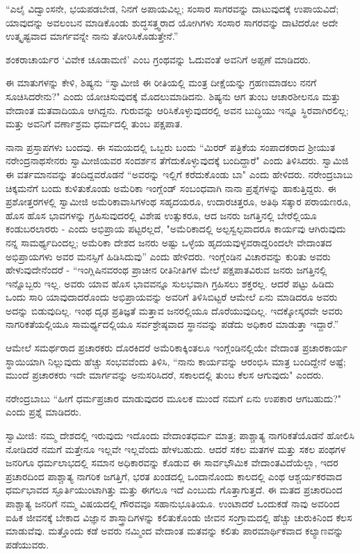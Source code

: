 “ಎಲೈ ವಿದ್ವಾಂಸನೇ, ಭಯಪಡಬೇಡ, ನಿನಗೆ ಅಪಾಯವಿಲ್ಲ; ಸಂಸಾರ ಸಾಗರವನ್ನು ದಾಟುವುದಕ್ಕೆ ಉಪಾಯವಿದೆ; ಯಾವುದನ್ನು ಅವಲಂಬನ ಮಾಡಿಕೊಂಡು ಶುದ್ಧಸತ್ತ್ವರಾದ ಯೋಗಿಗಳು ಸಂಸಾರ ಸಾಗರವನ್ನು ದಾಟಿದರೋ ಅದೇ ಉತ್ಕೃಷ್ಟವಾದ ಮಾರ್ಗವನ್ನೇ ನಾನು ತೋರಿಸಿಕೊಡುತ್ತೇನೆ.”

ಶಂಕರಾಚಾರ್ಯರ ‘ವಿವೇಕ ಚೂಡಾಮಣಿ’ ಎಂಬ ಗ್ರಂಥವನ್ನು ಓದುವಂತೆ ಅವನಿಗೆ ಅಪ್ಪಣೆ ಮಾಡಿದರು.

ಈ ಮಾತುಗಳನ್ನು ಕೇಳಿ, ಶಿಷ್ಯನು “ಸ್ವಾಮೀಜಿ ಈ ರೀತಿಯಲ್ಲಿ ಮಂತ್ರ ದೀಕ್ಷೆಯನ್ನು ಗ್ರಹಣಮಾಡಲು ನನಗೆ ಸೂಚಿಸಿದರೇನು?" ಎಂದು ಯೋಚಿಸುವುದಕ್ಕೆ ಮೊದಲುಮಾಡಿದನು. ಶಿಷ್ಯನು ಆಗ ತುಂಬ ಆಚಾರಶೀಲನೂ ಮತ್ತು ವೇದಾಂತ ಮತವಾದಿಯೂ ಆಗಿದ್ದನು. ಗುರುವನ್ನು ಆರಿಸಿಕೊಳ್ಳುವುದರಲ್ಲಿ ಅವನ ಬುದ್ಧಿಯು ಇನ್ನೂ ಸ್ಥಿರವಾಗಿರಲಿಲ್ಲ; ಮತ್ತು ಅವನಿಗೆ ವರ್ಣಾಶ್ರಮ ಧರ್ಮದಲ್ಲಿ ತುಂಬ ಪಕ್ಷಪಾತ.

ನಾನಾ ಪ್ರಸ್ತಾಪಗಳು ಬಂದವು. ಈ ಸಮಯದಲ್ಲಿ ಒಬ್ಬರು ಬಂದು “ಮಿರರ್ ಪತ್ರಿಕೆಯ ಸಂಪಾದಕರಾದ ಶ‍್ರೀಯುತ ನರೇಂದ್ರನಾಥಸೇನರು ಸ್ವಾಮೀಜಿಯವರ ಸಂದರ್ಶನ ತೆಗೆದುಕೊಳ್ಳುವುದಕ್ಕೆ ಬಂದಿದ್ದಾರೆ" ಎಂದು ತಿಳಿಸಿದರು. ಸ್ವಾಮಿಜಿ ಈ ವರ್ತಮಾನವನ್ನು ತಂದಿದ್ದವರೊಡನೆ “ಅವರನ್ನು ಇಲ್ಲಿಗೆ ಕರೆದುಕೊಂಡು ಬಾ" ಎಂದು ಹೇಳಿದರು. ನರೇಂದ್ರಬಾಬು ಚಿಕ್ಕಮನೆಗೆ ಬಂದು ಕುಳಿತುಕೊಂಡು ಅಮೆರಿಕಾ ಇಂಗ್ಲೆಂಡ್ ಸಂಬಂಧವಾಗಿ ನಾನಾ ಪ್ರಶ್ನೆಗಳನ್ನು ಹಾಕುತ್ತಿದ್ದರು. ಈ ಪ್ರಶೋತ್ತರಗಳಲ್ಲಿ ಸ್ವಾಮೀಜಿ ಅಮೆರಿಕಾವಾಸಿಗಳಂಥ ಸಹೃದಯರೂ, ಉದಾರಚಿತ್ತರೂ, ಅತಿಥಿ ಸತ್ಕಾರ ಪರಾಯಣರೂ, ಹೊಸ ಹೊಸ ಭಾವಗಳನ್ನು ಗ್ರಹಿಸುವುದರಲ್ಲಿ ವಿಶೇಷ ಉತ್ಸುಕರೂ, ಆದ ಜನರು ಜಗತ್ತಿನಲ್ಲಿ ಬೇರೆಲ್ಲಿಯೂ ಕಂಡುಬರಲಾರರು - ಎಂದು ಅಭಿಪ್ರಾಯ ಪಟ್ಟರಲ್ಲದೆ, "ಅಮೆರಿಕಾದಲ್ಲಿ ಅಲ್ಪಸ್ವಲ್ಪವಾದರೂ ಕಾರ್ಯವು ಆಗಿರುವುದು ನನ್ನ ಸಾಮರ್ಥ್ಯದಿಂದಲ್ಲ; ಅಮೆರಿಕಾ ದೇಶದ ಜನರು ಅಷ್ಟು ಒಳ್ಳೆಯ ಹೃದಯವುಳ್ಳವರಾದ್ದರಿಂದಲೇ ವೇದಾಂತದ ಅಭಿಪ್ರಾಯಗಳು ಅವರ ಮನಸ್ಸಿಗೆ ಹಿಡಿಸಿದುವು'' ಎಂದು ಹೇಳಿದರು. ಇಂಗ್ಲೆಂಡಿನ ವಿಚಾರವನ್ನು ಕುರಿತು ಅವರು ಹೇಳುವುದೇನೆಂದರೆ - “ಇಂಗ್ಲಿಷಿನವರಂಥ ಪ್ರಾಚೀನ ರೀತಿನೀತಿಗಳ ಮೇಲೆ ಪಕ್ಷಪಾತವಿರುವ ಜನರು ಜಗತ್ತಿನಲ್ಲಿ ಇನ್ನೊಬ್ಬರು ಇಲ್ಲ. ಅವರು ಯಾವ ಹೊಸ ಭಾವವನ್ನೂ ಸುಲಭವಾಗಿ ಗ್ರಹಿಸಲು ಶಕ್ತರಲ್ಲ. ಆದರೆ ಪಟ್ಟು ಹಿಡಿದು ಒಂದು ಸಾರಿ ಯಾವುದಾದರೊಂದು ಅಭಿಪ್ರಾಯವನ್ನು ಅವರಿಗೆ ತಿಳಿಸಿಬಿಟ್ಟರೆ ಆಮೇಲೆ ಏನು ಮಾಡಿದರೂ ಅವರು ಅದನ್ನು ಬಿಡುವುದಿಲ್ಲ. ಇಂಥ ದೃಢ ಪ್ರತಿಜ್ಞತೆ ಮತ್ತಾವ ಜನರಲ್ಲಿಯೂ ದೊರೆಯುವುದಿಲ್ಲ. ಇದಕ್ಕೋಸ್ಕರವೇ ಅವರು ನಾಗರಿಕತೆಯಲ್ಲಿಯೂ ಸಾಮರ್ಥ್ಯದಲ್ಲಿಯೂ ಸರ್ವಶ್ರೇಷ್ಠವಾದ ಸ್ಥಾನವನ್ನು ಪಡೆದು ಅಧಿಕಾರ ಮಾಡುತ್ತಾ ಇದ್ದಾರೆ.”

ಆಮೇಲೆ ಸಮರ್ಥರಾದ ಪ್ರಚಾರಕರು ದೊರಕಿದರೆ ಅಮೆರಿಕಾಕ್ಕಿಂತಲೂ ಇಂಗ್ಲೆಂಡಿನಲ್ಲಿಯೇ ವೇದಾಂತ ಪ್ರಚಾರಕಾರ್ಯ ಸ್ಥಾಯಿಯಾಗಿ ನಿಲ್ಲುವುದು ಹೆಚ್ಚು ಸಂಭವವೆಂದು ತಿಳಿಸಿ, “ನಾನು ಕಾರ್ಯವನ್ನು ಆರಂಭಿಸಿ ಮಾತ್ರ ಬಂದಿದ್ದೇನೆ ಅಷ್ಟೆ; ಮುಂದೆ ಪ್ರಚಾರಕರು ಇದೇ ಮಾರ್ಗವನ್ನು ಅನುಸರಿಸಿದರೆ, ಸಕಾಲದಲ್ಲಿ ತುಂಬ ಕೆಲಸ ಆಗುವುದು" ಎಂದರು.

ನರೇಂದ್ರಬಾಬು “ಹೀಗೆ ಧರ್ಮಪ್ರಚಾರ ಮಾಡುವುದರ ಮೂಲಕ ಮುಂದೆ ನಮಗೆ ಏನು ಉಪಕಾರ ಆಗಬಹುದು?" ಎಂದು ಪ್ರಶ್ನೆ ಮಾಡಿದರು.

ಸ್ವಾಮೀಜಿ: ನಮ್ಮ ದೇಶದಲ್ಲಿ ಇರುವುದು ಇದೊಂದು ವೇದಾಂತಧರ್ಮ ಮಾತ್ರ; ಪಾಶ್ಚಾತ್ಯ ನಾಗರಿಕತೆಯೊಡನೆ ಹೋಲಿಸಿ ನೋಡಿದರೆ ನಮಗೆ ಮತ್ತೇನೂ ಇಲ್ಲವೇ ಇಲ್ಲವೆಂದು ಹೇಳಬಹುದು. ಆದರೆ ಸಕಲ ಮತಗಳ ಮತ್ತು ಸಕಲ ಪಂಥಗಳ ಜನರಿಗೂ ಧರ್ಮಲಾಭದಲ್ಲಿ ಸಮಾನ ಅಧಿಕಾರವನ್ನು ಕೊಡುವ ಈ ಸಾರ್ವಭೌಮಿಕ ವೇದಾಂತವಿದೆಯೆಲ್ಲಾ, ಇದರ ಪ್ರಚಾರದಿಂದ ಪಾಶ್ಚಾತ್ಯ ನಾಗರಿಕ ಜಗತ್ತಿಗೆ, ಭರತ ಖಂಡದಲ್ಲಿ ಒಂದಾನೊಂದು ಕಾಲದಲ್ಲಿ ಎಂಥ ಆಶ್ಚರ್ಯಕರವಾದ ಧರ್ಮಭಾವದ ಸ್ಫೂರ್ತಿಯುಂಟಾಗಿತ್ತು ಮತ್ತು ಈಗಲೂ ಇದೆ ಎಂಬುದು ಗೊತ್ತಾಗುತ್ತದೆ. ಈ ಮತದ ಪ್ರಚಾರದಿಂದ ಪಾಶ್ಚಾತ್ಯ ಜನರಿಗೆ ನಮ್ಮ ವಿಷಯದಲ್ಲಿ ಗೌರವವೂ ಸಹಾನುಭೂತಿಯೂ. ಉಂಟಾದರೆ ಒಂದುಕಡೆ ನಾವು ಅವರಿಂದ ಐಹಿಕ ಜೀವನಕ್ಕೆ ಬೇಕಾದ ವಿಜ್ಞಾನ ಶಾಸ್ತ್ರಾದಿಗಳನ್ನು ಕಲಿತುಕೊಂಡು ಜೀವನ ಸಂಗ್ರಾಮದಲ್ಲಿ ಹೆಚ್ಚು ಚುರುಕಿನಿಂದ ಕೆಲಸ ಮಾಡುವೆವು. ಮತ್ತೊಂದು ಕಡೆ ಅವರು ನಮ್ಮಿಂದ ವೇದಾಂತ ಮತವನ್ನು ಕಲಿತು ಪಾರಮಾರ್ಥಿಕವಾದ ಕಲ್ಯಾಣವನ್ನು ಪಡೆಯುವರು.

